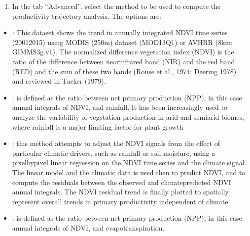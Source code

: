 \documentclass[letterpaper,10pt,english]{sphinxmanual}
\begin{document}
\begin{enumerate}
%
\setcounter{enumi}{2}
\item {} 
\sphinxAtStartPar
In the tab “Advanced”, select the method to be used to compute the
productivity trajectory analysis. The options are:

\end{enumerate}
\begin{itemize}
\item {} 
\sphinxAtStartPar
{}: This dataset shows the trend in annually integrated NDVI time
series (2001\sphinxhyphen{}2015) using MODIS (250m) dataset (MOD13Q1) or AVHRR (8km;
GIMMS3g.v1). The normalized difference vegetation index (NDVI) is the ratio
of the difference between near\sphinxhyphen{}infrared band (NIR) and the red band (RED) and
the sum of these two bands (Rouse et al., 1974; Deering 1978) and reviewed in
Tucker (1979).

\item {} 
\sphinxAtStartPar
{}: is defined as the ratio between net primary production (NPP), in
this case annual integrals of NDVI, and rainfall. It has been increasingly
used to analyze the variability of vegetation production in arid and
semi\sphinxhyphen{}arid biomes, where rainfall is a major limiting factor for plant growth

\item {} 
\sphinxAtStartPar
{}: this method attempts to adjust the NDVI signals from the effect
of particular climatic drivers, such as rainfall or soil moisture, using a
pixel\sphinxhyphen{}by\sphinxhyphen{}pixel linear regression on the NDVI time series and the climate
signal. The linear model and the climatic data is used then to predict NDVI,
and to compute the residuals between the observed and climate\sphinxhyphen{}predicted NDVI
annual integrals. The NDVI residual trend is finally plotted to spatially
represent overall trends in primary productivity independent of climate.

\item {} 
\sphinxAtStartPar
{}: is defined as the ratio between net primary production (NPP), in
this case annual integrals of NDVI, and evapotranspiration.

\end{itemize}
\end{document}
